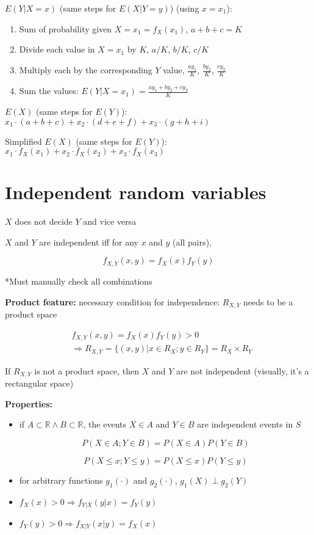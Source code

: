 \documentclass[twocolumn, 8pt]{extarticle}
\begin{document}
$E(Y | X = x)$ (same steps for $E(X | Y = y)$) (using $x = x_1$):

\begin{enumerate}
    \item Sum of probability given $X = x_1 = f_X(x_1)$, $a + b + c = K$
    \item Divide each value in $X = x_1$ by $K$, $a / K$, $b / K$, $c / K$
    \item Multiply each by the corresponding $Y$ value, $\frac{ay_1}{K}$, $\frac{by_2}{K}$, $\frac{cy_3}{K}$
    \item Sum the values: $\displaystyle E(Y | X = x_1) = \frac{ay_1 + by_2 + cy_3}{K}$
\end{enumerate}

$E(X)$ (same steps for $E(Y)$): $x_1 \cdot (a + b + c) + x_2 \cdot (d + e + f) + x_3 \cdot (g + h + i)$

Simplified $E(X)$ (same steps for $E(Y)$): $x_1 \cdot f_X(x_1) + x_2 \cdot f_X(x_2) + x_3 \cdot f_X(x_3)$

\section*{Independent random variables}

$X$ does not decide $Y$ and vice versa

$X$ and $Y$ are independent iff for any $x$ and $y$ (all pairs), 

$$
f_{X, Y}(x, y) = f_X(x)f_Y(y)
$$

*Must manually check all combinations

\textbf{Product feature:} necessary condition for independence: $R_{X, Y}$ needs to be a product space

\begin{equation*}
    \begin{split}
        & f_{X, Y} (x, y) = f_X(x)f_Y(y) > 0 \\
        & \Rightarrow R_{X, Y} = \{(x, y) | x \in R_X; y \in R_Y\} = R_X \times R_Y
    \end{split}
\end{equation*}

If $R_{X, Y}$ is not a product space, then $X$ and $Y$ are not independent (visually, it's a rectangular space)

\textbf{Properties:}

\begin{itemize}
    \item if $A \subset \mathbb{R} \land B \subset \mathbb{R}$, the events $X \in A$ and $Y \in B$ are independent events in $S$

    $$
    P(X \in A; Y \in B) = P(X \in A)P(Y \in B)
    $$

    $$
    P(X \leq x; Y \leq y) = P(X \leq x)P(Y \leq y)
    $$

    \item for arbitrary functions $g_1(\cdot)$ and $g_2(\cdot)$, $g_1(X) \perp g_2(Y)$

    \item $f_X(x) > 0 \Rightarrow f_{Y | X}(y|x) = f_Y(y)$
    \item $f_Y(y) > 0 \Rightarrow f_{X | Y}(x|y) = f_X(x)$
\end{itemize}
\end{document}
